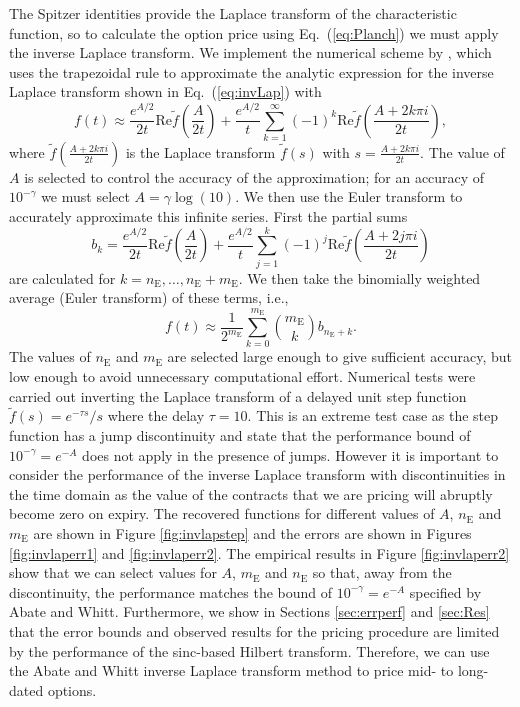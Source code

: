 \documentclass[11pt,a4paper]{article}
\begin{document}
The Spitzer identities provide the Laplace transform of the characteristic function, so to calculate the option price using Eq.~(\ref{eq:Planch}) we must apply the inverse Laplace transform. We implement the numerical scheme by \cite{Abate1995}, which uses the trapezoidal rule to approximate the analytic expression for the inverse Laplace transform shown in Eq.~(\ref{eq:invLap}) with
\begin{equation}
f(t) \approx \frac{e^{A/2}}{2t}\mathrm{Re}\widetilde{f}\left(\frac{A}{2t}\right)+\frac{e^{A/2}}{t}\sum_{k=1}^{\infty}(-1)^{k}\mathrm{Re}\widetilde{f}\left(\frac{A+2k\pi i}{2t}\right),\label{eq:invLapft}
\end{equation}
where $\widetilde{f}\left(\frac{A+2k\pi i}{2t}\right)$ is the Laplace transform $\widetilde{f}(s)$ with $s=\frac{A+2k\pi i}{2t}$. The value of $A$ is selected to control the accuracy of the approximation; for an accuracy of $10^{-\gamma}$ we must select $A=\gamma \log(10)$.
We then use the Euler transform to accurately approximate this infinite series. First the partial sums
\begin{equation}
b_k = \frac{e^{A/2}}{2t}\mathrm{Re}\widetilde{f}\left(\frac{A}{2t}\right)+\frac{e^{A/2}}{t}\sum_{j=1}^{k}(-1)^{j}\mathrm{Re}\widetilde{f}\left(\frac{A+2j\pi i}{2t}\right)\label{eq:invLapSl}
\end{equation}
are calculated for $k=n_\mathrm{E},\dots,n_\mathrm{E}+m_\mathrm{E}$. We then take the binomially weighted average (Euler transform) of these terms, i.e.,
\begin{equation}
f(t) \approx \frac{1}{2^{m_\mathrm{E}}}\sum_{k=0}^{m_\mathrm{E}}\binom{m_\mathrm{E}}{k}b_{n_\mathrm{E}+k}.
\end{equation}
The values of $n_\mathrm{E}$ and $m_\mathrm{E}$ are selected large enough to give sufficient accuracy, but low enough to avoid unnecessary computational effort.
Numerical tests were carried out inverting the Laplace transform of a delayed unit step function $\widetilde{f}(s)=e^{-\tau s}/s$ where the delay $\tau = 10$. This is an extreme test case as the step function has a jump discontinuity and \cite{Abate1992_2} state that the performance bound of $10^{-\gamma}=e^{-A}$ does not apply in the presence of jumps. However it is important to consider the performance of the inverse Laplace transform with discontinuities in the time domain as the value of the contracts that we are pricing will abruptly become zero on expiry. The recovered functions for different values of $A$, $n_\mathrm{E}$ and $m_\mathrm{E}$ are shown in Figure \ref{fig:invlapstep} and the errors are shown in Figures \ref{fig:invlaperr1} and \ref{fig:invlaperr2}. The empirical results in Figure \ref{fig:invlaperr2} show that we can select values for $A$, $m_\mathrm{E}$ and $n_\mathrm{E}$ so that, away from the discontinuity, the performance matches the bound of $10^{-\gamma}=e^{-A}$ specified by Abate and Whitt. Furthermore, we show in Sections \ref{sec:errperf} and \ref{sec:Res} that the error bounds and observed results for the pricing procedure are limited by the performance of the sinc-based Hilbert transform. Therefore, we can use the Abate and Whitt inverse Laplace transform method to price mid- to long-dated options.
\end{document}
